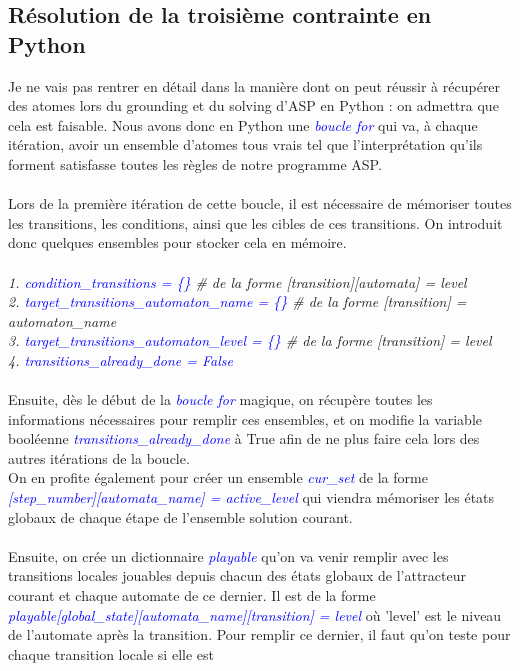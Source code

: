 \documentclass[10pt,a4paper]{article}
\begin{document}
\subsection{Résolution de la troisième contrainte en Python}
Je ne vais pas rentrer en détail dans la manière dont on peut réussir à récupérer des atomes lors du grounding et du solving d'ASP en Python : on admettra que cela est faisable. Nous avons donc en Python une 
\textcolor{blue}{\emph{boucle for}} qui va, à chaque itération, avoir un ensemble d'atomes tous vrais tel que l'interprétation qu'ils forment satisfasse toutes les règles de notre programme ASP.\\ \\
Lors de la première itération de cette boucle, il est nécessaire de mémoriser toutes les transitions, les conditions, ainsi que les cibles de ces transitions. On introduit donc quelques ensembles pour stocker cela en mémoire.\\ \\
\emph{
	1. \textcolor{blue}{condition\_transitions = \{\}} \# de la forme [transition][automata] = level\\
	2. \textcolor{blue}{target\_transitions\_automaton\_name = \{\}} \# de la forme [transition] = automaton\_name\\
	3. \textcolor{blue}{target\_transitions\_automaton\_level = \{\}}  \# de la forme [transition] = level\\
	4. \textcolor{blue}{transitions\_already\_done = False}\\ \\
}
Ensuite, dès le début de la \emph{\textcolor{blue}{boucle for}} magique, on récupère toutes les informations nécessaires pour remplir ces ensembles, et on modifie la variable booléenne \emph{\textcolor{blue}
{transitions\_already\_done}} à True afin de ne plus faire cela lors des autres itérations de la boucle.\\
On en profite également pour créer un ensemble \emph{\textcolor{blue}{cur\_set}}  de la forme \emph{\textcolor{blue}{[step\_number][automata\_name] = active\_level}} qui viendra mémoriser les états globaux de chaque étape de 
l'ensemble solution courant.\\ \\
Ensuite, on crée un dictionnaire \emph{\textcolor{blue}{playable}} qu'on va venir remplir avec les transitions locales jouables depuis chacun des états globaux de l'attracteur courant et chaque automate de ce dernier. Il est de la 
forme \\
\emph{\textcolor{blue}{playable[global\_state][automata\_name][transition] = level}} où 'level' est le niveau de l'automate après la transition. Pour remplir ce dernier, il faut qu'on teste pour chaque transition locale si elle est 
\end{document}
